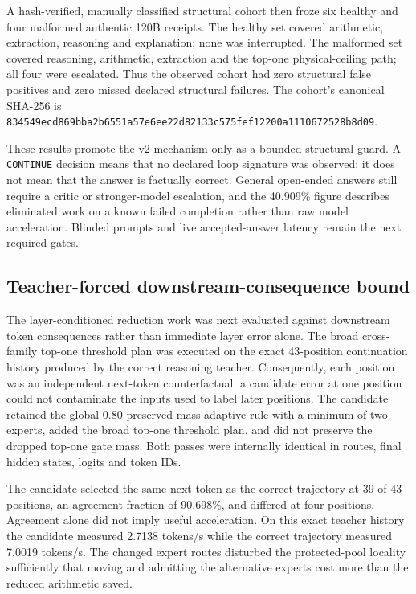 A hash-verified, manually classified structural cohort then froze six healthy
and four malformed authentic 120B receipts.  The healthy set covered
arithmetic, extraction, reasoning and explanation; none was interrupted.  The
malformed set covered reasoning, arithmetic, extraction and the top-one
physical-ceiling path; all four were escalated.  Thus the observed cohort had
zero structural false positives and zero missed declared structural failures.
The cohort's canonical SHA-256 is
\texttt{834549ecd869bba2b6551a57e6ee22d82133c575fef12200a1110672528b8d09}.

These results promote the v2 mechanism only as a bounded structural guard.  A
\texttt{CONTINUE} decision means that no declared loop signature was observed;
it does not mean that the answer is factually correct.  General open-ended
answers still require a critic or stronger-model escalation, and the 40.909\%
figure describes eliminated work on a known failed completion rather than raw
model acceleration.  Blinded prompts and live accepted-answer latency remain
the next required gates.

\subsection{Teacher-forced downstream-consequence bound}

The layer-conditioned reduction work was next evaluated against downstream
token consequences rather than immediate layer error alone.  The broad
cross-family top-one threshold plan was executed on the exact 43-position
continuation history produced by the correct reasoning teacher.  Consequently,
each position was an independent next-token counterfactual: a candidate error
at one position could not contaminate the inputs used to label later positions.
The candidate retained the global 0.80 preserved-mass adaptive rule with a
minimum of two experts, added the broad top-one threshold plan, and did not
preserve the dropped top-one gate mass.  Both passes were internally identical
in routes, final hidden states, logits and token IDs.

The candidate selected the same next token as the correct trajectory at 39 of
43 positions, an agreement fraction of 90.698\%, and differed at four
positions.  Agreement alone did not imply useful acceleration.  On this exact
teacher history the candidate measured 2.7138 tokens/s while the correct
trajectory measured 7.0019 tokens/s.  The changed expert routes disturbed the
protected-pool locality sufficiently that moving and admitting the alternative
experts cost more than the reduced arithmetic saved.

